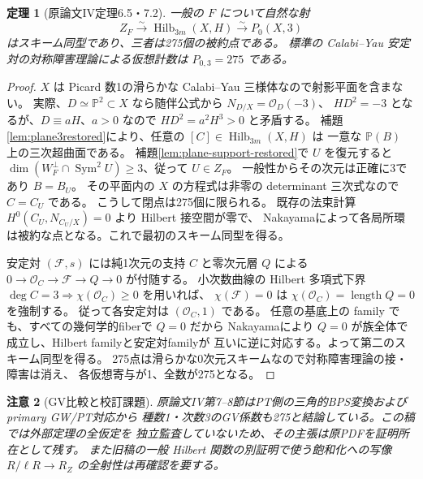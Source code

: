 \documentclass[11pt,a4paper]{ltjsarticle}
\newtheorem{theorem}{定理}[section]
\newtheorem{remark}[theorem]{注意}
\newcommand{\PP}{\mathbb P}
\newcommand{\OO}{\mathcal O}
\newcommand{\Sym}{\operatorname{Sym}}
\newcommand{\Hilb}{\operatorname{Hilb}}
\begin{document}
\begin{theorem}[原論文IV定理6.5・7.2]\label{thm:reye-pt275-restored}
一般の $F$ について自然な射
\[
 Z_F\xrightarrow{\sim}\Hilb_{3m}(X,H)
 \xrightarrow{\sim} P_0(X,3)
\]
はスキーム同型であり、三者は275個の被約点である。
標準の Calabi--Yau 安定対の対称障害理論による仮想計数は
$P_{0,3}=275$ である。
\end{theorem}
\begin{proof}
$X$ は Picard 数1の滑らかな Calabi--Yau 三様体なので射影平面を含まない。
実際、$D\simeq\PP^2\subset X$ なら随伴公式から $N_{D/X}=\OO_D(-3)$、
$HD^2=-3$ となるが、$D\equiv aH$、$a>0$ なので $HD^2=a^2H^3>0$ と矛盾する。
補題\ref{lem:plane3restored}により、任意の $[C]\in\Hilb_{3m}(X,H)$ は
一意な $\PP(B)$ 上の三次超曲面である。
補題\ref{lem:plane-support-restored}で $U$ を復元すると
$\dim(W_F^\perp\cap\Sym^2U)\ge3$、従って $U\in Z_F$。
一般性からその次元は正確に3であり $B=B_U$。
その平面内の $X$ の方程式は非零の determinant 三次式なので $C=C_U$ である。
こうして閉点は275個に限られる。
既存の法束計算 $H^0(C_U,N_{C_U/X})=0$ より Hilbert 接空間が零で、
Nakayamaによって各局所環は被約な点となる。これで最初のスキーム同型を得る。

安定対 $(\mathcal F,s)$ には純1次元の支持 $C$ と零次元層 $Q$ による
$0\to\OO_C\to\mathcal F\to Q\to0$ が付随する。
小次数曲線の Hilbert 多項式下界
$\deg C=3\Rightarrow\chi(\OO_C)\ge0$ を用いれば、
$\chi(\mathcal F)=0$ は $\chi(\OO_C)=\operatorname{length}Q=0$ を強制する。
従って各安定対は $(\OO_C,1)$ である。
任意の基底上の family でも、すべての幾何学的fiberで $Q=0$ だから
Nakayamaにより $Q=0$ が族全体で成立し、Hilbert familyと安定対familyが
互いに逆に対応する。よって第二のスキーム同型を得る。
275点は滑らかな0次元スキームなので対称障害理論の接・障害は消え、
各仮想寄与が1、全数が275となる。
\end{proof}

\begin{remark}[GV比較と校訂課題]
原論文IV第7--8節はPT側の三角的BPS変換およびprimary GW/PT対応から
種数1・次数3のGV係数も275と結論している。この稿では外部定理の全仮定を
独立監査していないため、その主張は原PDFを証明所在として残す。
また旧稿の一般 Hilbert 関数の別証明で使う飽和化への写像
$R/\ell R\to R_Z$ の全射性は再確認を要する。
\end{remark}
\end{document}
